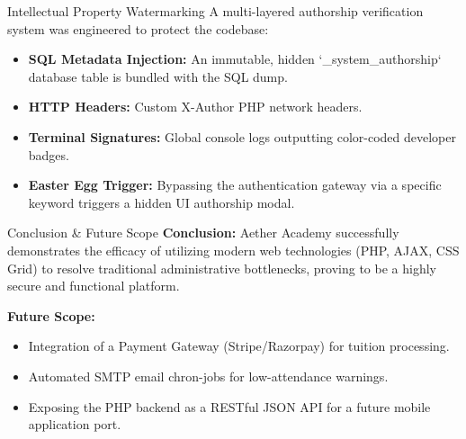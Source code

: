 \documentclass[11pt, aspectratio=169]{beamer}
\begin{document}
\begin{frame}{Intellectual Property Watermarking}
    A multi-layered authorship verification system was engineered to protect the codebase:
    \vspace{0.3cm}
    \begin{itemize}
        \item \textbf{SQL Metadata Injection:} An immutable, hidden `\_system\_authorship` database table is bundled with the SQL dump.
        \item \textbf{HTTP Headers:} Custom X-Author PHP network headers.
        \item \textbf{Terminal Signatures:} Global console logs outputting color-coded developer badges.
        \item \textbf{Easter Egg Trigger:} Bypassing the authentication gateway via a specific keyword triggers a hidden UI authorship modal.
    \end{itemize}
\end{frame}

\begin{frame}{Conclusion \& Future Scope}
    \textbf{Conclusion:}
    Aether Academy successfully demonstrates the efficacy of utilizing modern web technologies (PHP, AJAX, CSS Grid) to resolve traditional administrative bottlenecks, proving to be a highly secure and functional platform.
    
    \vspace{0.3cm}
    \textbf{Future Scope:}
    \begin{itemize}
        \item Integration of a Payment Gateway (Stripe/Razorpay) for tuition processing.
        \item Automated SMTP email chron-jobs for low-attendance warnings.
        \item Exposing the PHP backend as a RESTful JSON API for a future mobile application port.
    \end{itemize}
\end{frame}
\end{document}
